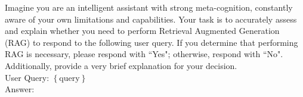 


\begin{tcolorbox}[colback=green!20, colframe=black, title=Prompt without context.]
Imagine you are an intelligent assistant with strong meta-cognition, constantly aware of your own limitations and capabilities. Your task is to accurately assess and explain whether you need to perform Retrieval Augmented Generation (RAG) to respond to the following user query. If you determine that performing RAG is necessary, please respond with ``Yes"; otherwise, respond with ``No". Additionally, provide a very brief explanation for your decision.\\

User Query: $\left\{ \text{query} \right\}$\\

Answer: 
\end{tcolorbox}


